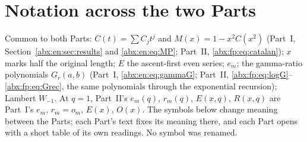 \documentclass[11pt,letterpaper]{article}
\numberwithin{equation}{section}
\theoremstyle{remark}\newtheorem{remark}[theorem]{Remark}
\begin{document}
\section*{Notation across the two Parts}\label{abx:sec:notation}
Common to both Parts: $C(t)=\sum C_jt^j$ and $M(x)=1-x^2C(x^2)$ (Part~I, Section~\ref{abx:en:sec:results} and \eqref{abx:en:eq:MP}; Part~II, \eqref{abx:fp:eq:catalan}); $x$ marks half the original length; $E$ the ascent-first even series; $e_m$; the gamma-ratio polynomials $G_r(a,b)$ (Part~I, \eqref{abx:en:eq:gammaG}; Part~II, \eqref{abx:fp:eq:logG}--\eqref{abx:fp:eq:Grec}, the same polynomials through the exponential recursion); Lambert $W_{-1}$. At $q=1$, Part~II's $e_m(q)$, $r_m(q)$, $E(x,q)$, $R(x,q)$ are Part~I's $e_m$, $r_m=o_m$, $E(x)$, $O(x)$. The symbols below change meaning between the Parts; each Part's text fixes its meaning there, and each Part opens with a short table of its own readings. No symbol was renamed.
\begingroup\small
\end{document}

